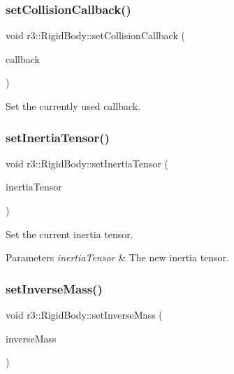 \subsubsection{\texorpdfstring{set\+Collision\+Callback()}{setCollisionCallback()}}
{\footnotesize\ttfamily void r3\+::\+Rigid\+Body\+::set\+Collision\+Callback (\begin{DoxyParamCaption}\item[{const \mbox{\hyperlink{classr3_1_1_collision_callback}{Collision\+Callback}} \&}]{callback }\end{DoxyParamCaption})}



Set the currently used callback. 

\mbox{\label{classr3_1_1_rigid_body_a01092f4ae330b7fd13421d8c8177a30e}} 
\subsubsection{\texorpdfstring{set\+Inertia\+Tensor()}{setInertiaTensor()}}
{\footnotesize\ttfamily void r3\+::\+Rigid\+Body\+::set\+Inertia\+Tensor (\begin{DoxyParamCaption}\item[{const glm\+::mat3 \&}]{inertia\+Tensor }\end{DoxyParamCaption})}



Set the current inertia tensor. 


\begin{DoxyParams}{Parameters}
{\em inertia\+Tensor} & The new inertia tensor. \\
\hline
\end{DoxyParams}
\mbox{\label{classr3_1_1_rigid_body_a28ee9e1542663a4e704077e9327ddece}} 
\subsubsection{\texorpdfstring{set\+Inverse\+Mass()}{setInverseMass()}}
{\footnotesize\ttfamily void r3\+::\+Rigid\+Body\+::set\+Inverse\+Mass (\begin{DoxyParamCaption}\item[{\mbox{\hyperlink{namespacer3_ab2016b3e3f743fb735afce242f0dc1eb}{real}}}]{inverse\+Mass }\end{DoxyParamCaption})}



